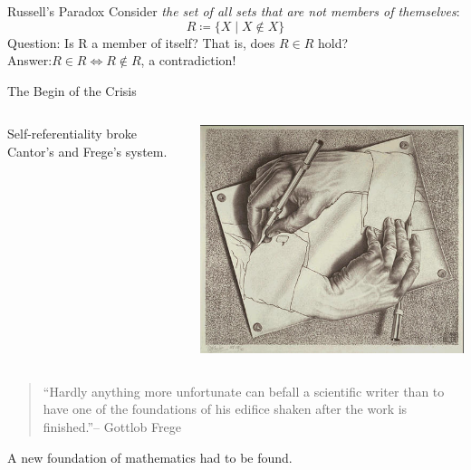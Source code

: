 \documentclass{beamer}
\begin{document}
\begin{frame}{Russell's Paradox}
	Consider \emph{the set of all sets that are not members of themselves}:
	\begin{equation*}
		R\coloneqq\{X\mid X\notin X\}
	\end{equation*}\pause
	Question: Is R a member of itself? That is, does $R\in R$ hold?\pause\\
	\vspace{\baselineskip}
	Answer:\hspace{4.3em}$R\in R \iff R\notin R$, a contradiction!
\end{frame}
\begin{frame}{The Begin of the Crisis}
	\begin{columns}[c,onlytextwidth]
	 \begin{column}{.65\textwidth}
		Self-referentiality broke Cantor's and Frege's system.
	 \end{column}
	 \begin{column}{.3\textwidth}
		\centering
		\includegraphics[width=\textwidth]{img/drawinghands.jpg}
	 \end{column}
	\end{columns}
	\pause
	\begin{quote}
		``Hardly anything more unfortunate can befall a scientific writer than to have one of the foundations of his edifice shaken after the work is finished.''\nocite{frege_appendix}\hfill-- Gottlob Frege
	\end{quote}
	\pause
	\centerline{\alert{A new foundation of mathematics had to be found.}}
\end{frame}
\end{document}
